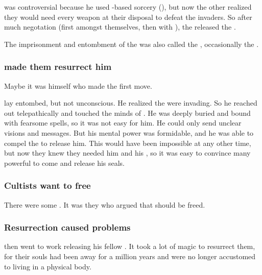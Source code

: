  was controversial because he used \xs-based sorcery (), but now the other \ophidians{} realized they would need every weapon at their disposal to defeat the \bane{} invaders. 
So after much negotation (first amongst themselves, then with \Sethicus), the \ophidians released the \dragons. 

The imprisonment and entombment of the \dragons was also called the , occasionally the .




\subsubsection{\Sethicus made them resurrect him}
Maybe it was \Sethicus himself who made the first move. 

\Sethicus lay entombed, but not unconscious.
He realized the \banes were invading.
So he reached out telepathically and touched the minds of \ophidians.
He was deeply buried and bound with fearsome spells, so it was not easy for him.
He could only send unclear visions and messages.
But his mental power was formidable, and he was able to compel the \ophidians to release him.
This would have been impossible at any other time, but now they knew they needed him and his \dragons, so it was easy to convince many powerful \ophidians to come and release his seals.





\subsubsection{Cultists want to free \Sethicus}
There were some . 
It was they who argued that \Sethicus should be freed. 





\subsubsection{Resurrection caused problems}
\Sethicus then went to work releasing his fellow \dragons.
It took a lot of magic to resurrect them, for their souls had been away for a million years and were no longer accustomed to living in a physical body.


